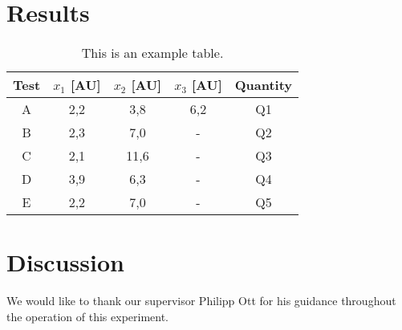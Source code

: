 \documentclass[twocolumn,
			   showpacs,%
               nofootinbib,
               aps,%
               eqsecnum,
               prd,
               notitlepage,
               showkeys,
               10pt]{revtex4-1}
\begin{document}
\blindtext




\section{Results}
\blindtext



\begin{table}[!htbp]
\centering
\setlength{\tabcolsep}{2mm}
\renewcommand{\arraystretch}{1.5}
\begin{tabular}{|c||c|c|c|c|}
\hline
Test & $x_1$ [AU] & $x_2$ [AU] & $x_3$ [AU] & Quantity \\ \hline \hline
A & 2,2 & 3,8 & 6,2 & Q1 \\
\hline
B & 2,3 & 7,0 & - & Q2 \\
\hline
C & 2,1 & 11,6 & - & Q3 \\
\hline
D & 3,9 & 6,3 & - & Q4\\
\hline
E & 2,2 & 7,0 & - & Q5 \\
\hline
\end{tabular}
\caption{\label{tab:test}This is an example table.}
\end{table}




\section{Discussion}

\Blindtext


\begin{acknowledgments}

We would like to thank our supervisor Philipp Ott for his guidance throughout the operation of this experiment.

\end{acknowledgments}




\nocite{*}
\end{document}
